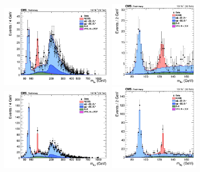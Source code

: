 {%
\begin{figure}[!htb]
	\vspace*{0.3cm}
	\begin{center}
		\includegraphics[width=0.5\textwidth]{Figures/KinDistr/M4lMain_Unblinded_4e_InclusiveRun2.png}
		\includegraphics[width=0.4\textwidth]{Figures/KinDistr/M4lMainZoomed_Unblinded_4e_InclusiveRun2.png}\\
		\includegraphics[width=0.5\textwidth]{Figures/KinDistr/M4lMain_Unblinded_4mu_InclusiveRun2.png}
		\includegraphics[width=0.4\textwidth]{Figures/KinDistr/M4lMainZoomed_Unblinded_4mu_InclusiveRun2.png}\\

\end{center}
\end{figure}}

